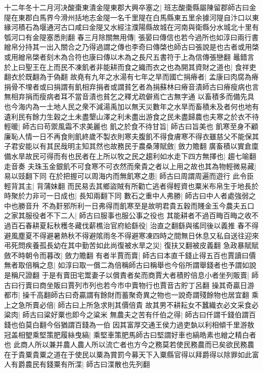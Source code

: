 十二年冬十二月河决酸棗東潰金隄東郡大興卒塞之|{
	班志酸棗縣屬陳留郡師古曰金隄在東郡白馬界今滑州括地志金隄一名千里隄在白馬縣東五里余據河隄自汴口以東緣河積石為堰通河古口咸曰金隄又水經注濮陽縣故城在河南與衛縣分水城北十里有瓠河口有金隄塞悉則翻}
春三月除關無用傳|{
	張晏曰傳信也若今過所也如淳曰兩行書繒帛分持其一出入關合之乃得過謂之傳也李奇曰傳棨也師古曰張說是也古者或用棨或用繒帛棨者刻木為合符也康曰傳以木為之長尺五書符于上為信傳張戀翻}
鼂錯言於上曰聖王在上而民不凍飢者非能耕而食之織而衣之也為開其資財之道也|{
	食祥吏翻衣於既翻為于偽翻}
故堯有九年之水湯有七年之旱而國亡捐瘠者|{
	孟康曰肉腐為瘠捐骨不埋者或曰捐謂有飢相弃捐者或謂貧乞者為捐蘇林曰瘠音漬師古曰瘠瘦病也言無相弃捐而瘦病者耳不當音漬也貧乞之釋尤疏僻焉亡古無字通}
以畜積多而備先具也今海内為一土地人民之衆不減湯禹加以無天災數年之水旱而畜積未及者何也地有遺利民有餘力生穀之土未盡墾山澤之利未盡出游食之民未盡歸農也夫寒之於衣不待輕暖|{
	師古曰苟禦風霜不求美麗也}
飢之於食不待甘旨|{
	師古曰旨美也}
飢寒至身不顧廉恥人情一日不再食則飢終歲不製衣則寒夫腹飢不得食膚寒不得衣雖慈父不能保其子君安能以有其民哉明主知其然也故務民于農桑薄賦斂|{
	斂力贍翻}
廣畜積以實倉廩備水旱故民可得而有也民者在上所以牧之民之趨利如水走下四方無擇也|{
	趨七喻翻走音奏}
夫珠玉金銀飢不可食寒不可衣然而衆貴之者以上用之故也其為物輕微易藏|{
	易以豉翻下同}
在於把握可以周海内而無飢寒之患|{
	師古曰周謂周遍而遊行}
此令臣輕背其主|{
	背蒲妹翻}
而民易去其鄉盜賊有所勸亡逃者得輕資也粟米布帛生于地長於時聚於力非可一日成也|{
	長知兩翻下同}
數石之重中人弗勝|{
	師古曰中人者處強弱之中也勝音升}
不為姧邪所利一日弗得而飢寒至是故明君貴五穀而賤金玉今農夫五口之家其服役者不下二人|{
	師古曰服事也服公事之役也}
其能耕者不過百畮百畮之收不過百石春耕夏耘秋穫冬藏伐薪樵治官府給繇役|{
	治直之翻繇與徭同後以義推}
春不得避風塵夏不得避暑熱秋不得避隂雨冬不得避寒凍四時之間無日休息又私自送往迎來弔死問疾養孤長幼在其中勤苦如此尚復被水旱之災|{
	復扶又翻被皮義翻}
急政暴賦賦斂不時朝令而暮改|{
	斂力贍翻}
有者半賈而賣|{
	師古曰本直千錢止得五百也賈讀曰價}
無者取倍稱之息|{
	如淳曰取一償二為倍稱師古曰稱舉也今俗所謂舉錢者也予謂如說是稱尺證翻}
于是有賣田宅鬻妻子以償責者矣而商賈大者積貯倍息小者坐列販賣|{
	師古曰行賣曰商坐販曰賈列市列也若今市中賣物行也賈音古貯丁呂翻}
操其奇贏日游都市|{
	操千高翻師古曰奇贏謂有餘財而蓄聚奇異之物也一說奇謂殘餘物也居宜翻}
乘上之急所賣必倍|{
	師古曰上所急求則其價倍貴}
故其男不耕耘女不蠶織衣必文采食必粱肉|{
	師古曰粱好粟也即今之粱米}
無農夫之苦有仟伯之得|{
	師古曰仟謂千錢伯謂百錢也伯莫白翻今俗猶謂百錢為一伯}
因其富厚交通王侯力過吏埶以利相傾千里游敖冠盖相朢乘堅策肥履絲曳縞|{
	乘堅車策肥馬師古曰堅謂好車也縞皓素也繒之精白者也}
此商人所以兼并農人農人所以流亡者也方今之務莫若使民務農而已矣欲民務農在于貴粟貴粟之道在于使民以粟為賞罰今募天下入粟縣官得以拜爵得以除罪如此富人有爵農民有錢粟有所渫|{
	師古曰渫散也先列翻}
